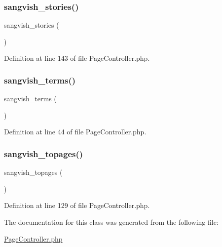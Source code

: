 \subsubsection{\texorpdfstring{sangvish\_stories()}{sangvish\_stories()}}
{\footnotesize\ttfamily sangvish\+\_\+stories (\begin{DoxyParamCaption}{ }\end{DoxyParamCaption})}



Definition at line 143 of file Page\+Controller.\+php.

\mbox{\label{class_responsive_1_1_http_1_1_controllers_1_1_page_controller_abe44a85c7579fe400be7cb6153b0e088}} 
\subsubsection{\texorpdfstring{sangvish\_terms()}{sangvish\_terms()}}
{\footnotesize\ttfamily sangvish\+\_\+terms (\begin{DoxyParamCaption}{ }\end{DoxyParamCaption})}



Definition at line 44 of file Page\+Controller.\+php.

\mbox{\label{class_responsive_1_1_http_1_1_controllers_1_1_page_controller_a1b00813bd52ff012b7bba02e4610e7bb}} 
\subsubsection{\texorpdfstring{sangvish\_topages()}{sangvish\_topages()}}
{\footnotesize\ttfamily sangvish\+\_\+topages (\begin{DoxyParamCaption}{ }\end{DoxyParamCaption})}



Definition at line 129 of file Page\+Controller.\+php.



The documentation for this class was generated from the following file\+:\begin{DoxyCompactItemize}
\item 
\mbox{\hyperlink{_page_controller_8php}{Page\+Controller.\+php}}\end{DoxyCompactItemize}
